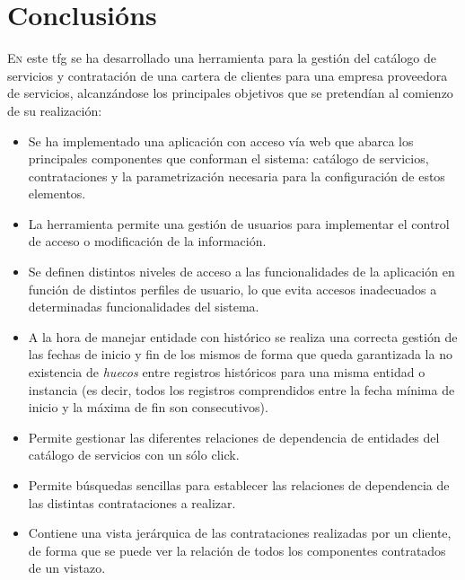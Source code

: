 \chapter{Conclusións}
\label{chap:conclusions}

\lettrine{E}{n} este \acrshort{tfg} se ha desarrollado una herramienta para la gestión del catálogo de servicios y contratación de una cartera de clientes para una empresa proveedora de servicios, alcanzándose los principales objetivos que se pretendían al comienzo de su realización:

\begin{itemize}
\item Se ha implementado una aplicación con acceso vía web que abarca los principales componentes que conforman el sistema: catálogo de servicios, contrataciones y la parametrización necesaria para la configuración de estos elementos.

\item La herramienta permite una gestión de usuarios para implementar el control de acceso o modificación de la información.

\item Se definen distintos niveles de acceso a las funcionalidades de la aplicación en función de distintos perfiles de usuario, lo que evita accesos inadecuados a determinadas funcionalidades del sistema.

\item A la hora de manejar entidade con histórico se realiza una correcta gestión de las fechas de inicio y fin de los mismos de forma que queda garantizada la no existencia de \textit{huecos} entre registros históricos para una misma entidad o instancia (es decir, todos los registros comprendidos entre la fecha mínima de inicio y la máxima de fin son consecutivos).

\item Permite gestionar las diferentes relaciones de dependencia de entidades del catálogo de servicios con un sólo click.

\item Permite búsquedas sencillas para establecer las relaciones de dependencia de las distintas contrataciones a realizar.

\item Contiene una vista jerárquica de las contrataciones realizadas por un cliente, de forma que se puede ver la relación de todos los componentes contratados de un vistazo.

\end{itemize}


